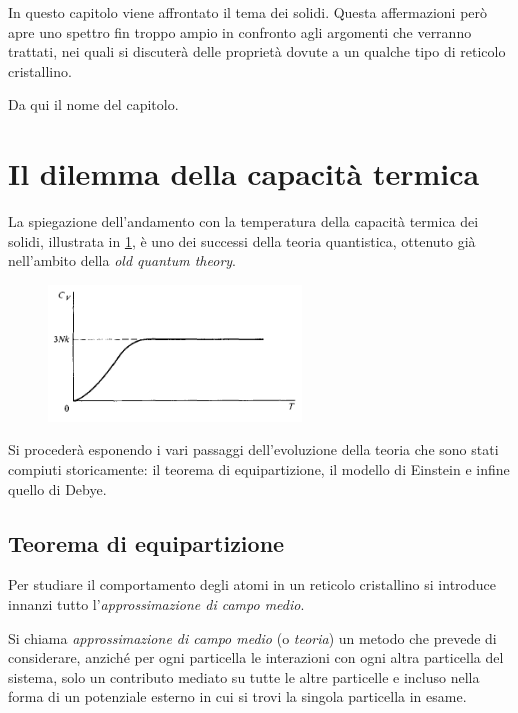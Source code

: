 
In questo capitolo viene affrontato il tema dei solidi. Questa affermazioni però apre uno spettro fin troppo ampio in confronto agli argomenti che verranno trattati, nei quali si discuterà delle proprietà dovute a un qualche tipo di reticolo cristallino.

Da qui il nome del capitolo.

\section{Il dilemma della capacità termica}

La spiegazione dell'andamento con la temperatura della capacità termica dei solidi, illustrata in \cref{fig:heatcap}, è uno dei successi della teoria quantistica, ottenuto già nell'ambito della \textit{old quantum theory}.

\begin{figure}[h]
	\centering
	\includegraphics[width=0.6\textwidth]{Immagini/HeatCapacity.png}
	\vspace{-10pt}
	\caption{}
	\label{fig:heatcap}
\end{figure}

Si procederà esponendo i vari passaggi dell'evoluzione della teoria che sono stati compiuti storicamente: il teorema di equipartizione, il modello di Einstein e infine quello di Debye.

\subsection{Teorema di equipartizione}

Per studiare il comportamento degli atomi in un reticolo cristallino si introduce innanzi tutto l'\textit{approssimazione di campo medio}.

\begin{defn}
	Si chiama \textit{approssimazione di campo medio} (o \textit{teoria}) un metodo che prevede di considerare, anziché per ogni particella le interazioni con ogni altra particella del sistema, solo un contributo mediato su tutte le altre particelle e incluso nella forma di un potenziale esterno in cui si trovi la singola particella in esame. 
\end{defn}

